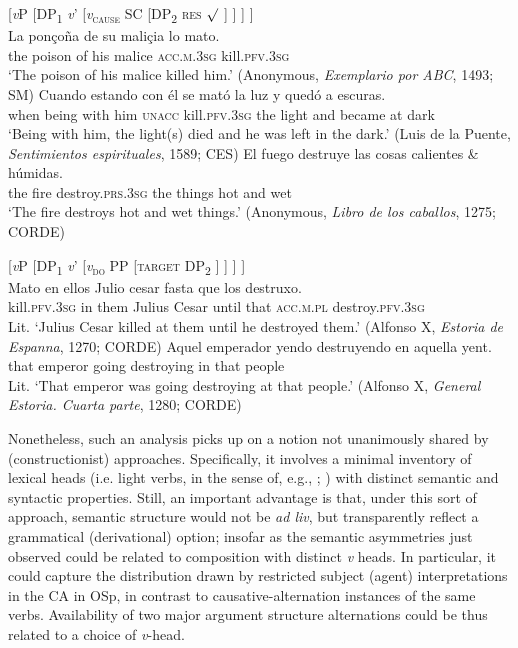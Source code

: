 \documentclass[output=paper,colorlinks,citecolor=brown,
]{langscibook}
\begin{document}
\ea\label{ex:mangialavori:ponçoña} [\textit{v}P [DP\textsubscript{1} \textit{v}' [\textit{v}\textsubscript{\textsc{cause}} SC [DP\textsubscript{2} \textsc{res} $\surd$ ] ] ] ]\\
  \ea\label{ex:mangialavori:transitive}
    \gll La ponçoña de su maliçia lo mato.\\
the poison of his malice \textsc{acc}.\textsc{m}.\textsc{3sg} kill.\textsc{pfv}.\textsc{3sg}\\
    \glt ‘The poison of his malice killed him.’ (Anonymous, \textit{Exemplario por ABC}, 1493; SM) 
  \ex\label{ex:mangialavori:unaccusative}
    \gll Cuando estando con él se mató la luz y quedó a escuras.\\ 
when being with him \textsc{unacc} kill.\textsc{pfv}.\textsc{3sg} the light and became at dark\\
    \glt ‘Being with him, the light(s) died and he was left in the dark.’ (Luis de la Puente, \textit{Sentimientos espirituales}, 1589; CES) 
  \ex\label{ex:mangialavori:36a}
    \gll El fuego destruye las cosas calientes \& húmidas.\\
the fire destroy.\textsc{prs}.\textsc{3sg} the things hot and wet\\
    \glt ‘The fire destroys hot and wet things.’ (Anonymous, \textit{Libro de los caballos}, 1275; CORDE) 
  \z 
\z 

\ea\label{ex:mangialavori:37} [\textit{v}P [DP\textsubscript{1} \textit{v}' [\textit{v}\textsubscript{\textsc{do}} PP [\textsc{target} DP\textsubscript{2} ] ] ] ]\\
  \ea
    \gll Mato en ellos Julio cesar fasta que los destruxo.\\
kill.\textsc{pfv}.\textsc{3sg} in them Julius Cesar until that \textsc{acc}.\textsc{m}.\textsc{pl} destroy.\textsc{pfv}.\textsc{3sg}\\
    \glt Lit. ‘Julius Cesar killed at them until he destroyed them.’ (Alfonso X, \textit{Estoria de Espanna}, 1270; CORDE)
  \ex
    \gll Aquel emperador yendo destruyendo en aquella yent.\\
 that emperor going destroying in that people\\
    \glt Lit. ‘That emperor was going destroying at that people.’ (Alfonso X, \textit{General Estoria. Cuarta parte}, 1280; CORDE)
  \z 
\z 

Nonetheless, such an analysis picks up on a notion not unanimously shared by (constructionist) approaches. Specifically, it involves a minimal inventory of lexical heads (i.e. light verbs, in the sense of, e.g., \citealt{HaleAndKeyser2002}; \citealt{FolliAndHarley2005,FolliAndHarley2007}) with distinct semantic and syntactic properties. Still, an important advantage is that, under this sort of approach, semantic structure would not be \textit{ad liv}, but transparently reflect a grammatical (derivational) option; insofar as the semantic asymmetries just observed could be related to composition with distinct \textit{v} heads. In particular, it could capture the distribution drawn by restricted subject (agent) interpretations in the CA in OSp, in contrast to causative-alternation instances of the same verbs. Availability of two major argument structure alternations could be thus related to a choice of \textit{v}-head. 
\end{document}
